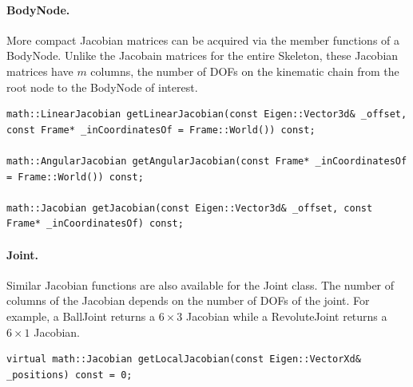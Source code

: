 

\paragraph{BodyNode.} More compact Jacobian matrices can be acquired
via the member functions of a BodyNode. Unlike the Jacobain matrices
for the entire Skeleton, these Jacobian matrices have $m$ columns, the number of DOFs on the kinematic chain from the root node to the BodyNode of interest.


\begin{lstlisting}[caption=BodyNode.h]
math::LinearJacobian getLinearJacobian(const Eigen::Vector3d& _offset, const Frame* _inCoordinatesOf = Frame::World()) const;

math::AngularJacobian getAngularJacobian(const Frame* _inCoordinatesOf = Frame::World()) const;

math::Jacobian getJacobian(const Eigen::Vector3d& _offset, const Frame* _inCoordinatesOf) const;
\end{lstlisting}

\paragraph{Joint.} Similar Jacobian functions are also available for
the Joint class. The number of columns of the Jacobian depends on the
number of DOFs of the joint. For example, a BallJoint returns a $6
\times 3$ Jacobian while a RevoluteJoint returns a $6 \times 1$ Jacobian.

\begin{lstlisting}[caption=Joint.h]
virtual math::Jacobian getLocalJacobian(const Eigen::VectorXd&
_positions) const = 0;
\end{lstlisting}




